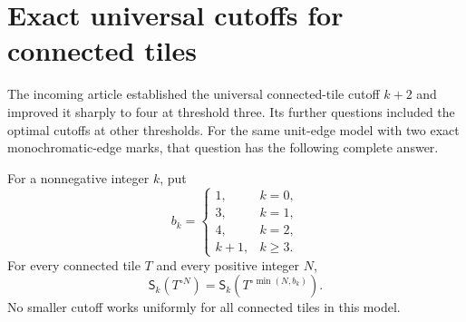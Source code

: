 
\section{Exact universal cutoffs for connected tiles}
\label{sec:exact-cutoffs}

The incoming article established the universal connected-tile cutoff $k+2$
and improved it sharply to four at threshold three.  Its further questions
included the optimal cutoffs at other thresholds.  For the same unit-edge
model with two exact monochromatic-edge marks, that question has the following
complete answer.

\begin{theorem}
\label{thm:exact-cutoff}
For a nonnegative integer $k$, put
\[
 b_k=\begin{cases}
 1,&k=0,\\
 3,&k=1,\\
 4,&k=2,\\
 k+1,&k\geq3.
 \end{cases}
\]
For every connected tile $T$ and every positive integer $N$,
\[
 \mathsf S_k(T^{\circ N})
   =\mathsf S_k(T^{\circ\min(N,b_k)}).
\]
No smaller cutoff works uniformly for all connected tiles in this model.
\end{theorem}

